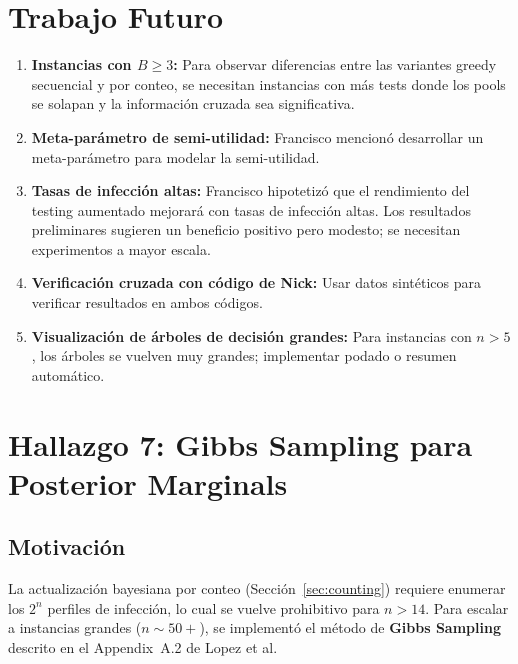 \documentclass[11pt, a4paper]{article}
\begin{document}
\section{Trabajo Futuro}

\begin{enumerate}[nosep]
    \item \textbf{Instancias con $B \geq 3$:} Para observar diferencias entre
    las variantes greedy secuencial y por conteo, se necesitan instancias con
    m\'as tests donde los pools se solapan y la informaci\'on cruzada sea
    significativa.

    \item \textbf{Meta-par\'ametro de semi-utilidad:} Francisco mencion\'o
    desarrollar un meta-par\'ametro para modelar la semi-utilidad.

    \item \textbf{Tasas de infecci\'on altas:} Francisco hipotetiz\'o que el
    rendimiento del testing aumentado mejorar\'a con tasas de infecci\'on
    altas. Los resultados preliminares sugieren un beneficio positivo pero
    modesto; se necesitan experimentos a mayor escala.

    \item \textbf{Verificaci\'on cruzada con c\'odigo de Nick:} Usar datos
    sint\'eticos para verificar resultados en ambos c\'odigos.

    \item \textbf{Visualizaci\'on de \'arboles de decisi\'on grandes:} Para
    instancias con $n > 5$, los \'arboles se vuelven muy grandes;
    implementar podado o resumen autom\'atico.
\end{enumerate}

\section{Hallazgo 7: Gibbs Sampling para Posterior Marginals}

\subsection{Motivaci\'on}
La actualizaci\'on bayesiana por conteo (Secci\'on~\ref{sec:counting}) requiere
enumerar los $2^n$ perfiles de infecci\'on, lo cual se vuelve prohibitivo para
$n > 14$. Para escalar a instancias grandes ($n \sim 50+$), se implement\'o el
m\'etodo de \textbf{Gibbs Sampling} descrito en el Appendix~A.2 de Lopez et al.
\end{document}
